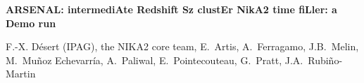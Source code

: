\documentclass[10pt,a4paper,twoside,graphicx,color]{article}
\begin{document}
%
%
\begin{center}{\huge \bf
ARSENAL: intermediAte Redshift Sz clustEr NikA2 time fiLler: a Demo run
}\end{center}
% 
\begin{center}
  F.-X. D\'esert (IPAG), the NIKA2 core team, E.~Artis,
  A.~Ferragamo, J.B.~Melin, M.~Muñoz Echevarría, A.~Paliwal,
  E.~Pointecouteau, G.~Pratt, J.A.~Rubiño-Martin
%   
% 

\end{center}
\end{document}
